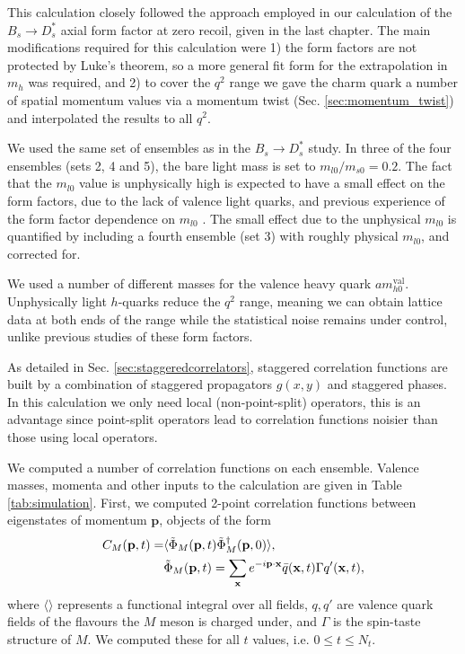 This calculation closely followed the approach employed in our calculation of the $B_s\to D_s^*$ axial form factor at zero recoil, given in the last chapter. The main modifications required for this calculation were 1) the form factors are not protected by Luke's theorem, so a more general fit form for the extrapolation in $m_h$ was required, and 2) to cover the $q^2$ range we gave the charm quark a number of spatial momentum values via a momentum twist (Sec. \ref{sec:momentum_twist}) and interpolated the results to all $q^2$.

We used the same set of ensembles as in the $B_s\to D_s^*$ study. In three of the four ensembles (sets 2, 4 and 5), the bare light mass is set to $m_{l0}/m_{s0} = 0.2$. The fact that the $m_{l0}$ value is unphysically high is expected to have a small effect on the form factors, due to the lack of valence light quarks, and previous experience of the form factor dependence on $m_{l0}$ \cite{Monahan:2017uby}. The small effect due to the unphysical $m_{l0}$ is quantified by including a fourth ensemble (set 3) with roughly physical $m_{l0}$, and corrected for. 

We used a number of different masses for the valence heavy quark $am_{h0}^{\text{val}}$. Unphysically light $h$-quarks reduce the $q^2$ range, meaning we can obtain lattice data at both ends of the range while the statistical noise remains under control, unlike previous studies of these form factors.

As detailed in Sec. \ref{sec:staggeredcorrelators}, staggered correlation functions are built by a combination of staggered propagators $g(x,y)$ and staggered phases. In this calculation we only need local (non-point-split) operators, this is an advantage since point-split operators lead to correlation functions noisier than those using local operators.

We computed a number of correlation functions on each ensemble. Valence masses, momenta and other inputs to the calculation are given in Table \ref{tab:simulation}. First, we computed 2-point correlation functions between eigenstates of momentum ${\textbf{p}}$, objects of the form
\begin{align}
  C_{M}({\textbf{p}},t) =& \langle \tilde{\Phi}_M ({\bf{p}},t) \tilde{\Phi}_M^{\dagger}({\bf{p}},0) \rangle, \\ 
  &\tilde{\Phi}_M({\bf{p}},t) = \sum_{{\bf{x}}} e^{-i\bf{p}\cdot \bf{x}} \bar{q}({\bf{x}},t) \Gamma q'({\bf{x}},t), \nonumber
\end{align}
where $\langle \rangle$ represents a functional integral over all fields, $q,q'$ are valence quark fields of the flavours the $M$ meson is charged under, and $\Gamma$ is the spin-taste structure of $M$. We computed these for all $t$ values, i.e. $0\leq t \leq N_t$.

